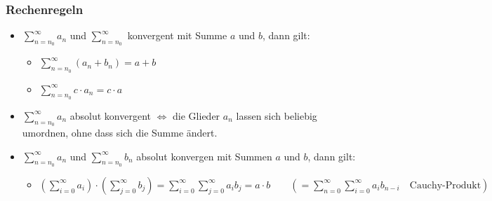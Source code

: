 \subsubsection{Rechenregeln}
\begin{itemize}
\item $\sum_{n=n_0}^\infty a_n$ und $\sum_{n=n_0}^\infty$ konvergent mit Summe $a$ und $b$, dann gilt: 
\begin{itemize}
\item $\sum_{n=n_0}^\infty (a_n+b_n)= a + b$
\item $\sum_{n=n_0}^\infty c\cdot a_n= c\cdot a$
\end{itemize}
\item $\sum_{n=n_0}^\infty a_n$ absolut konvergent $\Leftrightarrow$ die Glieder $a_n$ lassen sich beliebig umordnen, ohne dass sich die Summe ändert.
\item $\sum_{n=n_0}^\infty a_n$ und $\sum_{n=n_0}^\infty b_n$ absolut konvergen mit Summen $a$ und $b$, dann gilt:
\begin{itemize}
\item $\left(\sum_{i=0}^\infty a_i\right)\cdot \left( \sum_{j=0}^\infty b_j\right)=\sum_{i=0}^\infty  \sum_{j=0}^\infty a_i b_j=a\cdot b \qquad \left( =\sum_{n=0}^\infty  \sum_{i=0}^\infty a_i b_{n-i} \quad \text{Cauchy-Produkt}\right)$
\end{itemize}
\end{itemize}